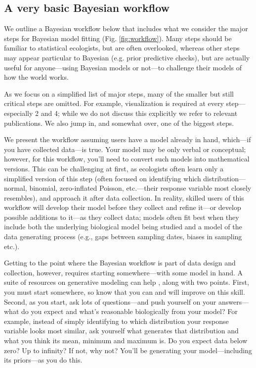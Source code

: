 \documentclass[11pt]{article}
\begin{document}
{\subsection{A very basic Bayesian workflow}

We outline a Bayesian workflow below that includes what we consider the major steps for Bayesian model fitting (Fig. \ref{fig:workflow}). Many steps should be familiar to statistical ecologists, but are often overlooked, whereas other steps may appear particular to Bayesian (e.g. prior predictive checks), but are actually useful for anyone---using Bayesian models or not---to challenge their models of how the world works. 

As we focus on a simplified list of major steps, many of the smaller but still critical steps are omitted. For example, visualization is required at every step---especially 2 and 4; while we do not discuss this explicitly we refer to relevant publications. We also jump in, and somewhat over, one of the biggest steps. 

We present the workflow assuming users have a model already in hand, which---if you have collected data---is true. Your model may be only verbal or conceptual; however, for this workflow, you'll need to convert such models into mathematical versions. This can be challenging at first, as ecologists often learn only a simplified version of this step (often focused on identifying which distribution---normal, binomial, zero-inflated Poisson, etc.---their response variable most closely resembles), and approach it after data collection. In reality, skilled users of this workflow will develop their model before they collect and refine it---or develop possible additions to it---as they collect data; models often fit best when they include both the underlying biological model being studied and a model of the data generating process (e.g., gaps between sampling dates, biases in sampling etc.). 

Getting to the point where the Bayesian workflow is part of data design and collection, however, requires starting somewhere---with some model in hand. A suite of resources on generative modeling can help \citep{statrethink,betangen}, along with two points. First, you must start somewhere, so know that you can and will improve on this skill. Second, as you start, ask lots of questions---and push yourself on your answers---what do you expect and what's reasonable biologically from your model? For example, instead of simply identifying to which distribution your response variable looks most similar, ask yourself what generates that distribution and what you think its mean, minimum and maximum is. Do you expect data below zero? Up to infinity? If not, why not? You'll be generating your model---including its priors---as you do this. 

}
\end{document}
